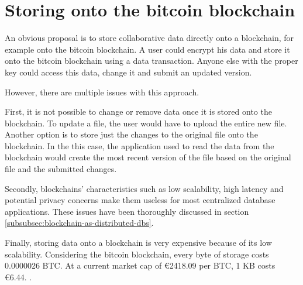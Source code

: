 \section{Storing onto the bitcoin blockchain}
\label{store-on-bitcoin}

\iffalse
- very obvious solution would be to store data directly onto a blockchain, eg. the bitcoin blockchain. you would just put all the data, properly encrypted, directly onto the blockchain and it is stored

\fi

An obvious proposal is to store collaborative data directly onto a blockchain, for example onto the bitcoin blockchain. A user could encrypt his data and store it onto the bitcoin blockchain using a data transaction. Anyone else with the proper key could access this data, change it and submit an updated version.

\iffalse
- various issues arise: 
  - basic functionality is missing that several applications need: you are not able to change or remove data once stored data, to update a file you would have to store the entire file again or store just the change and have your application reading the blockchain create the most recent file.
  - as mentioned in section \ref{subsubsec:blockchain-as-distributed-dbs}, blockchains deal with low scalability, high latency and potential privacy concerns.
  - insanely expensive: 0.0000026 BTC per byte \cite{bitcoin-transaction-fee}. At a current market cap of €2418.09 per BTC, the cost of storage is €6.44 per KB. \cite{bitcoin-market-cap}
\fi

However, there are multiple issues with this approach. 

First, it is not possible to change or remove data once it is stored onto the blockchain. To update a file, the user would have to upload the entire new file. Another option is to store just the changes to the original file onto the blockchain. In the this case, the application used to read the data from the blockchain would create the most recent version of the file based on the original file and the submitted changes. 

Secondly, blockchains' characteristics such as low scalability, high latency and potential privacy concerns make them useless for most centralized database applications. These issues have been thoroughly discussed in section \ref{subsubsec:blockchain-as-distributed-dbs}.

Finally, storing data onto a blockchain is very expensive because of its low scalability. Considering the bitcoin blockchain, every byte of storage costs 0.0000026 BTC\cite{bitcoin-transaction-fee}. At a current market cap of €2418.09 per BTC, 1 KB costs €6.44. \cite{bitcoin-market-cap}.

